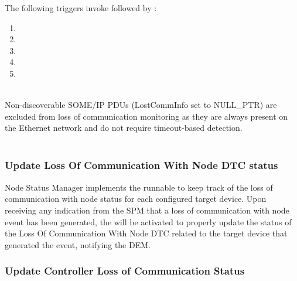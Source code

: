 The following triggers invoke  followed by :
\begin{enumerate}
    \item {}
    \item {}
    \item {}
    \item {}
    \item {} 
\end{enumerate}

{         }

\\
Non-discoverable SOME/IP PDUs (LostCommInfo set to NULL\_PTR) are excluded from loss of communication monitoring as they are always present on the Ethernet network and do not require timeout-based detection.
\\
{}
\\

\subsubsection{Update Loss Of Communication With Node DTC status}

Node Status Manager implements the runnable  to keep track of the loss of communication with node status for each configured target device. 
Upon receiving any indication from the SPM that a loss of communication with node event has been generated, the  will be activated to
properly update the status of the Loss Of Communication With Node DTC related to the target device that generated the event, notifying the DEM.

{  }

\subsubsection{Update Controller Loss of Communication Status}


